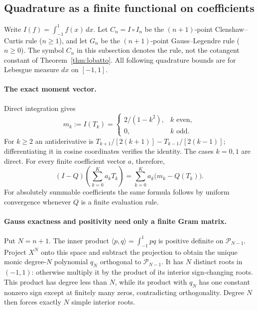 \documentclass[11pt]{article}
\newcommand{\PP}{\mathcal P}
\theoremstyle{remark}\newtheorem{remark}[theorem]{Remark}
\begin{document}
\subsection{Quadrature as a finite functional on coefficients}
Write $I(f)=\int_{-1}^1f(x)\,dx$. Let $C_n=I\circ I_n$ be the
$(n+1)$-point Clenshaw--Curtis rule ($n\ge1$), and let $G_n$ be the
$(n+1)$-point Gauss--Legendre rule ($n\ge0$). The symbol $C_n$ in this
subsection denotes the rule, not the cotangent constant of
Theorem~\ref{thm:lobatto}. All following quadrature bounds are for
Lebesgue measure $dx$ on $[-1,1]$.

\paragraph{The exact moment vector.}
Direct integration gives
\begin{equation}\label{eq:moments}
 m_k:=I(T_k)=
 \begin{cases}2/(1-k^2),&k\text{ even},\\0,&k\text{ odd}.
 \end{cases}
\end{equation}
For $k\ge2$ an antiderivative is
$T_{k+1}/[2(k+1)]-T_{k-1}/[2(k-1)]$; differentiating it in cosine
coordinates verifies the identity. The cases $k=0,1$ are direct.
For every finite coefficient vector $a$, therefore,
\begin{equation}\label{eq:functional}
 (I-Q)\left(\sum_{k=0}^K a_kT_k\right)
    =\sum_{k=0}^K a_k\bigl(m_k-Q(T_k)\bigr).
\end{equation}
For absolutely summable coefficients the same formula follows by uniform
convergence whenever $Q$ is a finite evaluation rule.

\paragraph{Gauss exactness and positivity need only a finite Gram matrix.}
Put $N=n+1$. The inner product $\langle p,q\rangle=\int_{-1}^1pq$
is positive definite on $\PP_{N-1}$. Project $X^N$ onto this space and
subtract the projection to obtain the unique monic degree-$N$ polynomial
$q_N$ orthogonal to $\PP_{N-1}$. It has $N$ distinct roots in $(-1,1)$:
otherwise multiply it by the product of its interior sign-changing
roots. This product has degree less than $N$, while its product with
$q_N$ has one constant nonzero sign except at finitely many zeros,
contradicting orthogonality. Degree $N$ then forces exactly $N$ simple
interior roots.
\end{document}
